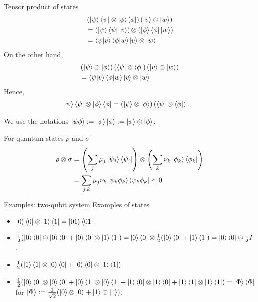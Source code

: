 \documentclass[10pt]{beamer}
\begin{document}
\begin{frame}{Tensor product of states}
\small
\begin{align*}
&\left(\ket{\psi}\bra{\psi}
\otimes
\ket{\phi}\bra{\phi}\right) \left(\ket{v}\otimes \ket{w}\right)\\
&=
\left(\ket{\psi}\bra{\psi}\ket{v}\right)\otimes
\left(\ket{\phi}\bra{\phi}\ket{w}\right)\\
&=\braket{\psi|v}\braket{\phi|w}
\ket{v}\otimes \ket{w}
\end{align*}
On the other hand,
\begin{align*}
&\left(\ket{\psi}\otimes\ket{\phi}\right)
\left(\bra{\psi}\otimes\bra{\phi}\right) \left(\ket{v}\otimes \ket{w}\right)\\
&=\braket{\psi|v}\braket{\phi|w}
\ket{v}\otimes \ket{w}
\end{align*}
Hence,
\begin{align*}
&\ket{\psi}\bra{\psi}
\otimes
\ket{\phi}\bra{\phi} =
\left(\ket{\psi}\otimes\ket{\phi}\right)
\left(\bra{\psi}\otimes\bra{\phi}\right).
\end{align*}

\vspace{1em}
We use the notations $\ket{\psi\phi}:=\ket{\psi}\ket{\phi}:=\ket{\psi}\otimes\ket{\phi}$.

For quantum states $\rho$ and $\sigma$
\begin{align*}
\rho\otimes\sigma
&=
\left(\sum_j \mu_j \ket{\psi_j}\bra{\psi_j}\right)\otimes
\left(\sum_k \nu_k \ket{\phi_k}\bra{\phi_k}\right)\\
&=\sum_{j,k}\mu_j\nu_k\ket{\psi_k\phi_k}\bra{\psi_k\phi_k}
\succeq0
\end{align*}
\end{frame}

\begin{frame}{Examples: two-qubit system}
Examples of states
\begin{itemize}
\setlength{\itemsep}{2em}
\item $\ket{0}\bra{0}\otimes \ket{1}\bra{1} = \ket{01}\bra{01}$
\item $\frac12 (\ket{0}\bra{0}\otimes \ket{0}\bra{0} + \ket{0}\bra{0}\otimes \ket{1}\bra{1}) =
 \ket{0}\bra{0}\otimes \frac12(\ket{0}\bra{0} + \ket{1}\bra{1}) = \ket{0}\bra{0}\otimes \frac12 I$.
\item $\frac12 (\ket{1}\bra{1}\otimes \ket{0}\bra{0} + \ket{0}\bra{0}\otimes \ket{1}\bra{1})$.
\item $\frac12(\ket{0}\bra{0}\otimes \ket{0}\bra{0} + \ket{0}\bra{1}\otimes \ket{0}\bra{1}  + \ket{1}\bra{0}\otimes \ket{1}\bra{0} + \ket{1}\bra{1}\otimes \ket{1}\bra{1} )
= \ket{\Phi}\bra{\Phi}$ for $\ket{\Phi}:=\frac1{\sqrt{2}}(\ket{0}\otimes\ket{0}+\ket{1}\otimes\ket{1})$.
\end{itemize}
\end{frame}
\end{document}
